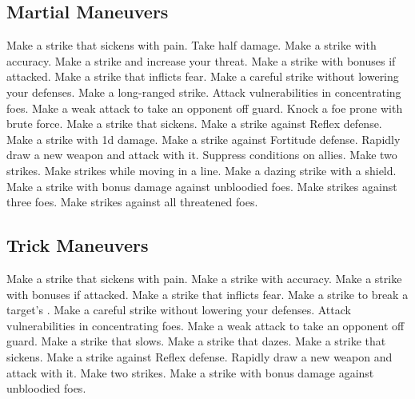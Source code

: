 \subsection{Martial Maneuvers}\label{Martial Maneuvers}
\begin{spelllist}
 Make a strike that sickens with pain.
 Take half damage.
 Make a strike with  accuracy.
 Make a strike and increase your threat.
 Make a strike with bonuses if attacked.
 Make a strike that inflicts fear.
 Make a careful strike without lowering your defenses.
 Make a long-ranged strike.
 Attack vulnerabilities in concentrating foes.
 Make a weak attack to take an opponent off guard.
 Knock a foe prone with brute force.
 Make a strike that sickens.
 Make a strike against Reflex defense.
 Make a strike with \plus1d damage.
 Make a strike against Fortitude defense.
 Rapidly draw a new weapon and attack with it.
 Suppress conditions on allies.
 Make two strikes.
 Make strikes while moving in a line.
 Make a dazing strike with a shield.
 Make a strike with bonus damage against unbloodied foes.
 Make strikes against three foes.
 Make strikes against all threatened foes.
\end{spelllist}



\small
\subsection{Trick Maneuvers}\label{Trick Maneuvers}
\begin{spelllist}
 Make a strike that sickens with pain.
 Make a strike with  accuracy.
 Make a strike with bonuses if attacked.
 Make a strike that inflicts fear.
 Make a strike to break a target's .
 Make a careful strike without lowering your defenses.
 Attack vulnerabilities in concentrating foes.
 Make a weak attack to take an opponent off guard.
 Make a strike that slows.
 Make a strike that dazes.
 Make a strike that sickens.
 Make a strike against Reflex defense.
 Rapidly draw a new weapon and attack with it.
 Make two strikes.
 Make a strike with bonus damage against unbloodied foes.
\end{spelllist}



